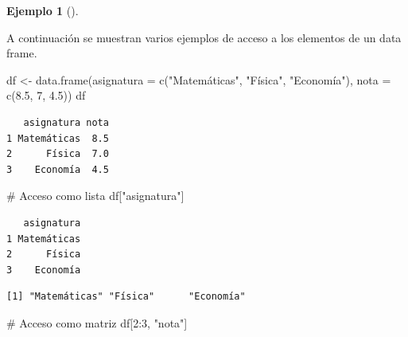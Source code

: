 \documentclass[
  a4paper,
]{scrreport}
\newenvironment{Shaded}{\begin{snugshade}}{\end{snugshade}}
\newcommand{\AttributeTok}[1]{\textcolor[rgb]{0.40,0.45,0.13}{#1}}
\newcommand{\CommentTok}[1]{\textcolor[rgb]{0.37,0.37,0.37}{#1}}
\newcommand{\DecValTok}[1]{\textcolor[rgb]{0.68,0.00,0.00}{#1}}
\newcommand{\FloatTok}[1]{\textcolor[rgb]{0.68,0.00,0.00}{#1}}
\newcommand{\FunctionTok}[1]{\textcolor[rgb]{0.28,0.35,0.67}{#1}}
\newcommand{\NormalTok}[1]{\textcolor[rgb]{0.00,0.23,0.31}{#1}}
\newcommand{\OtherTok}[1]{\textcolor[rgb]{0.00,0.23,0.31}{#1}}
\newcommand{\SpecialCharTok}[1]{\textcolor[rgb]{0.37,0.37,0.37}{#1}}
\newcommand{\StringTok}[1]{\textcolor[rgb]{0.13,0.47,0.30}{#1}}
\theoremstyle{definition}
\theoremstyle{definition}
\newtheorem{example}{Ejemplo}[chapter]
\theoremstyle{remark}
\begin{document}
\leavevmode{}%
\begin{example}[]\label{exm-acceso-data-frame}

A continuación se muestran varios ejemplos de acceso a los elementos de
un data frame.

\begin{Shaded}
\begin{Highlighting}[]
\NormalTok{df }\OtherTok{\textless{}{-}} \FunctionTok{data.frame}\NormalTok{(}\AttributeTok{asignatura =} \FunctionTok{c}\NormalTok{(}\StringTok{"Matemáticas"}\NormalTok{, }\StringTok{"Física"}\NormalTok{, }\StringTok{"Economía"}\NormalTok{), }\AttributeTok{nota =} \FunctionTok{c}\NormalTok{(}\FloatTok{8.5}\NormalTok{, }\DecValTok{7}\NormalTok{, }\FloatTok{4.5}\NormalTok{))}
\NormalTok{df}
\end{Highlighting}
\end{Shaded}

\begin{verbatim}
   asignatura nota
1 Matemáticas  8.5
2      Física  7.0
3    Economía  4.5
\end{verbatim}

\begin{Shaded}
\begin{Highlighting}[]
\CommentTok{\# Acceso como lista}
\NormalTok{df[}\StringTok{"asignatura"}\NormalTok{]}
\end{Highlighting}
\end{Shaded}

\begin{verbatim}
   asignatura
1 Matemáticas
2      Física
3    Economía
\end{verbatim}

\begin{Shaded}
\end{Shaded}

\begin{verbatim}
[1] "Matemáticas" "Física"      "Economía"   
\end{verbatim}

\begin{Shaded}
\begin{Highlighting}[]
\CommentTok{\# Acceso como matriz}
\NormalTok{df[}\DecValTok{2}\SpecialCharTok{:}\DecValTok{3}\NormalTok{, }\StringTok{"nota"}\NormalTok{]}
\end{Highlighting}
\end{Shaded}


\end{example}
\end{document}
